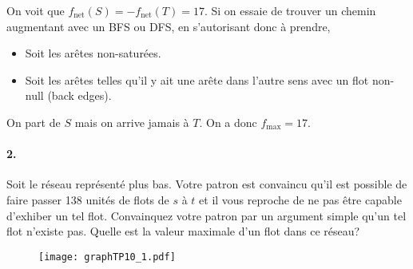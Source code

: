\begin{solution}
  On voit que $f_\mathrm{net}(S) = -f_\mathrm{net}(T) = 17$.
  Si on essaie de trouver un chemin augmentant avec un BFS ou DFS,
  en s'autorisant donc à prendre,
  \begin{itemize}
    \item Soit les arêtes non-saturées.
    \item Soit les arêtes telles qu'il y ait une arête dans l'autre
      sens avec un flot non-null (back edges).
  \end{itemize}
  On part de $S$ mais on arrive jamais à $T$.
  On a donc $f_\mathrm{max} = 17$.
  \begin{center}
  \end{center}
\end{solution}


\paragraph{2. } Soit le réseau représenté plus bas. Votre patron est convaincu qu'il est possible de faire passer 138 unités de flots de $s$ à $t$ et il vous reproche de ne pas être capable d'exhiber un tel flot. Convainquez votre patron par un argument simple qu'un tel flot n'existe pas. Quelle est la valeur maximale d'un flot dans ce réseau? 

\begin{figure}[h!]
\centering
\texttt{[image: graphTP10\_1.pdf]}
\end{figure}

